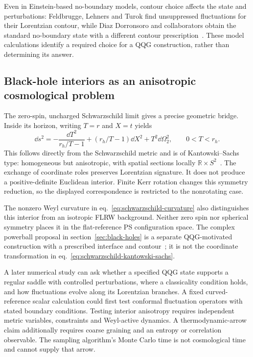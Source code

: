 Even in Einstein-based no-boundary models, contour choice affects the state and perturbations: Feldbrugge, Lehners and Turok find unsuppressed fluctuations for their Lorentzian contour, while Diaz Dorronsoro and collaborators obtain the standard no-boundary state with a different contour prescription~\cite{Feldbrugge:2017,Dorronsoro:2017}.  These model calculations identify a required choice for a QQG construction, rather than determining its answer.

\subsection{Black-hole interiors as an anisotropic cosmological problem}
\label{sec:interior-cosmology}

The zero-spin, uncharged Schwarzschild limit gives a precise geometric bridge.  Inside its horizon, writing $T=r$ and $X=t$ yields
\begin{equation}
 \dd s^2=-\frac{\dd T^2}{r_h/T-1}
 +(r_h/T-1)\dd X^2+T^2\dd\Omega_2^2,
 \qquad 0<T<r_h.
 \label{eq:schwarzschild-kantowski-sachs}
\end{equation}
This follows directly from the Schwarzschild metric and is of Kantowski--Sachs type: homogeneous but anisotropic, with spatial sections locally $\mathbb R\times S^2$~\cite{KantowskiSachs:1966}.  The exchange of coordinate roles preserves Lorentzian signature.  It does not produce a positive-definite Euclidean interior.  Finite Kerr rotation changes this symmetry reduction, so the displayed correspondence is restricted to the nonrotating case.

The nonzero Weyl curvature in eq.~\eqref{eq:schwarzschild-curvature} also distinguishes this interior from an isotropic FLRW background.  Neither zero spin nor spherical symmetry places it in the flat-reference PS configuration space.  The complex powerball proposal in section~\ref{sec:black-holes} is a separate QQG-motivated construction with a prescribed interface and contour~\cite{LiuPowerballs:2025}; it is not the coordinate transformation in eq.~\eqref{eq:schwarzschild-kantowski-sachs}.

A later numerical study can ask whether a specified QQG state supports a regular saddle with controlled perturbations, where a classicality condition holds, and how fluctuations evolve along its Lorentzian branches.  A fixed curved-reference scalar calculation could first test conformal fluctuation operators with stated boundary conditions.  Testing interior anisotropy requires independent metric variables, constraints and Weyl-active dynamics.  A thermodynamic-arrow claim additionally requires coarse graining and an entropy or correlation observable.  The sampling algorithm's Monte Carlo time is not cosmological time and cannot supply that arrow.

